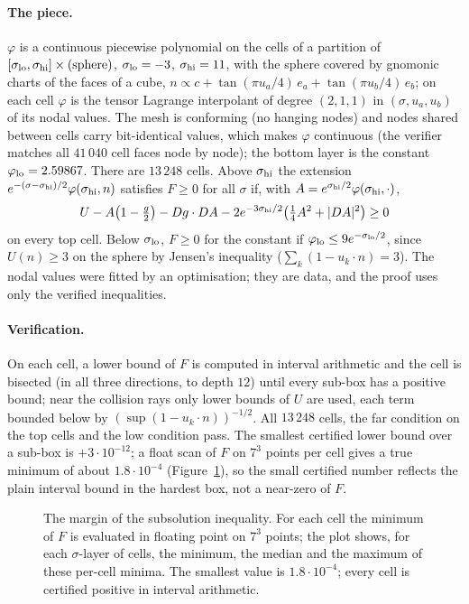 \documentclass[11pt]{article}
\theoremstyle{definition}
\begin{document}
\paragraph{The piece.} $\varphi$ is a continuous piecewise polynomial on the cells of a partition of
$[\sigma_{\rm lo},\sigma_{\rm hi}]\times(\text{sphere})$, $\sigma_{\rm lo}=-3$, $\sigma_{\rm hi}=11$, with the sphere
covered by gnomonic charts of the faces of a cube, $n\propto c+\tan(\pi u_a/4)\,e_a+\tan(\pi u_b/4)\,e_b$; on each
cell $\varphi$ is the tensor Lagrange interpolant of degree $(2,1,1)$ in $(\sigma,u_a,u_b)$ of its nodal values.
The mesh is conforming (no hanging nodes) and nodes shared between cells carry bit-identical values, which makes
$\varphi$ continuous (the verifier matches all $41\,040$ cell faces node by node); the bottom layer is the
constant $\varphi_{\rm lo}=2.59867$. There are $13\,248$ cells. Above $\sigma_{\rm hi}$ the extension
$e^{-(\sigma-\sigma_{\rm hi})/2}\varphi(\sigma_{\rm hi},n)$ satisfies $F\ge0$ for all $\sigma$ if, with
$A=e^{\sigma_{\rm hi}/2}\varphi(\sigma_{\rm hi},\cdot)$,
\[
U-A\bigl(1-\tfrac g2\bigr)-Dg\cdot DA-2e^{-3\sigma_{\rm hi}/2}\bigl(\tfrac14A^2+|DA|^2\bigr)\ge0
\]
on every top cell. Below $\sigma_{\rm lo}$, $F\ge0$ for the constant if $\varphi_{\rm lo}\le9e^{-\sigma_{\rm lo}/2}$,
since $U(n)\ge3$ on the sphere by Jensen's inequality ($\sum_k(1-u_k\cdot n)=3$).
The nodal values were fitted by an optimisation; they are data, and the proof uses only the verified inequalities.

\paragraph{Verification.} On each cell, a lower bound of $F$ is computed in interval arithmetic and the cell is
bisected (in all three directions, to depth $12$) until every sub-box has a positive bound; near the collision rays
only lower bounds of $U$ are used, each term bounded below by $(\sup(1-u_k\cdot n))^{-1/2}$. All $13\,248$ cells, the far condition on the top cells and the low condition pass.
The smallest certified lower bound over a sub-box is $+3\cdot10^{-12}$; a float scan of $F$ on $7^3$ points per cell
gives a true minimum of about $1.8\cdot10^{-4}$ (Figure~\ref{fig:cellmin}), so the small certified number reflects the
plain interval bound in the hardest box, not a near-zero of $F$.

\begin{figure}[t]\centering
\figcellmin
\caption{The margin of the subsolution inequality. For each cell the minimum of $F$ is evaluated in floating point on
$7^3$ points; the plot shows, for each $\sigma$-layer of cells, the minimum, the median and the maximum of these
per-cell minima. The smallest value is $1.8\cdot10^{-4}$; every cell is certified positive in interval
arithmetic.}\label{fig:cellmin}
\end{figure}
\end{document}
